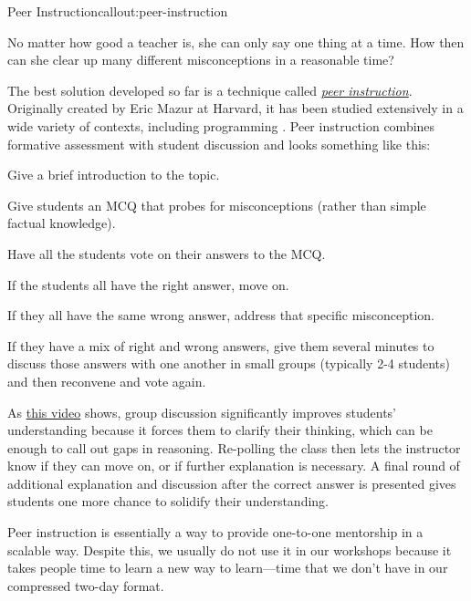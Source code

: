 \begin{callout}{Peer Instruction}{callout:peer-instruction}

No matter how good a teacher is, she can only say one thing at a time.
How then can she clear up many different misconceptions in a reasonable
time?

The best solution developed so far is a technique called
\emph{\href{https://en.wikipedia.org/wiki/Peer\_instruction}{peer
instruction}}. Originally created by Eric Mazur at Harvard, it has
been studied extensively in a wide variety of contexts, including
programming \cite{bib:porter-what-works}. Peer instruction combines
formative assessment with student discussion and looks something like
this:

\begin{genumerate}

\item
  Give a brief introduction to the topic.

\item
  Give students an MCQ that probes for misconceptions (rather than
  simple factual knowledge).

\item
  Have all the students vote on their answers to the MCQ.

  \begin{genumerate}

  \item
    If the students all have the right answer, move on.

  \item
    If they all have the same wrong answer, address that specific
    misconception.

  \item
    If they have a mix of right and wrong answers, give them several
    minutes to discuss those answers with one another in small groups
    (typically 2-4 students) and then reconvene and vote again.

  \end{genumerate}

\end{genumerate}

As \href{https://www.youtube.com/watch?t=1\&v=2LbuoxAy56o}{this video}
shows, group discussion significantly improves students' understanding
because it forces them to clarify their thinking, which can be enough to
call out gaps in reasoning. Re-polling the class then lets the
instructor know if they can move on, or if further explanation is
necessary. A final round of additional explanation and discussion after
the correct answer is presented gives students one more chance to
solidify their understanding.

Peer instruction is essentially a way to provide one-to-one mentorship
in a scalable way. Despite this, we usually do not use it in our
workshops because it takes people time to learn a new way to
learn---time that we don't have in our compressed two-day format.

\end{callout}

